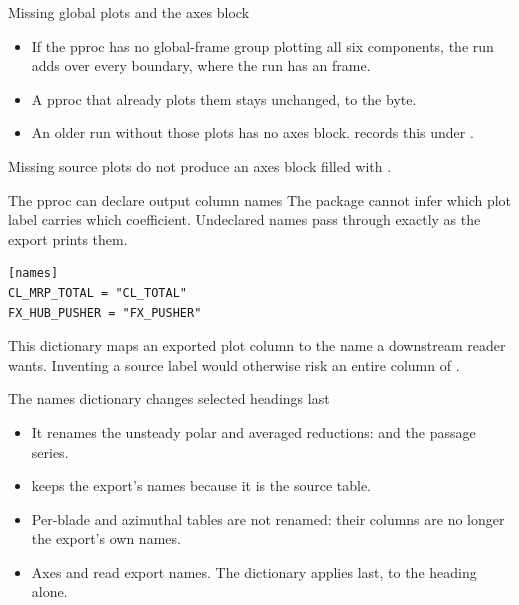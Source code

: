 \begin{frame}{Missing global plots and the axes block}
\begin{itemize}\small
  \item If the pproc has no global-frame group plotting all six components,
        the run adds  over every boundary, where the run
        has an  frame.
  \item A pproc that already plots them stays unchanged, to the byte.
  \item An older run without those plots has no axes block.
         records this under .
\end{itemize}
\begin{takeaway}
Missing source plots do not produce an axes block filled with .
\end{takeaway}
\end{frame}

\begin{frame}[fragile]{The pproc can declare output column names}
\small The package cannot infer which plot label carries which coefficient.
Undeclared names pass through exactly as the export prints them.
\begin{lstlisting}[style=ftsbase]
[names]
CL_MRP_TOTAL = "CL_TOTAL"
FX_HUB_PUSHER = "FX_PUSHER"
\end{lstlisting}
\small This dictionary maps an exported plot column to the name
a downstream reader wants. Inventing a source label would otherwise risk
an entire column of .
\end{frame}

\begin{frame}{The names dictionary changes selected headings last}
\begin{itemize}\small
  \item It renames the unsteady polar and averaged reductions:
         and the passage series.
  \item {} keeps the export's names because
        it is the source table.
  \item Per-blade and azimuthal tables are not renamed: their columns are
        no longer the export's own names.
  \item Axes and \code{[equations]} read export names.
        The dictionary applies last, to the heading alone.
\end{itemize}
\end{frame}


